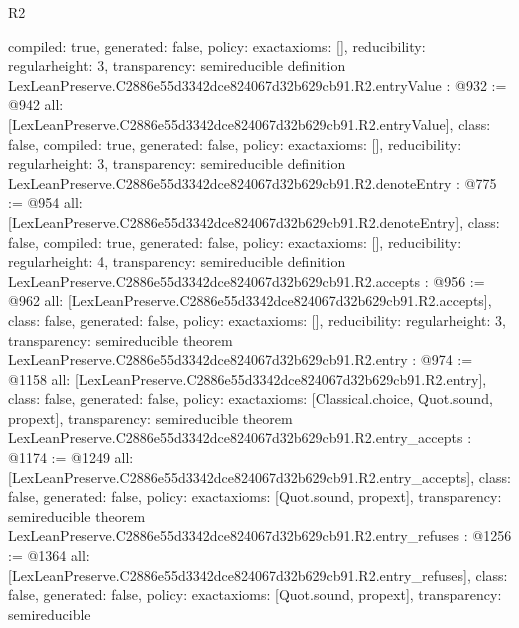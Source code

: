 \begin{lexlean}{R2}
\begin{coremodule}
{  compiled: true,
  generated: false,
  policy: exact{axioms: []},
  reducibility: regular{height: 3},
  transparency: semireducible
}
definition LexLeanPreserve.C2886e55d3342dce824067d32b629cb91.R2.entryValue : @932 := @942 {
  all: [LexLeanPreserve.C2886e55d3342dce824067d32b629cb91.R2.entryValue],
  class: false,
  compiled: true,
  generated: false,
  policy: exact{axioms: []},
  reducibility: regular{height: 3},
  transparency: semireducible
}
definition LexLeanPreserve.C2886e55d3342dce824067d32b629cb91.R2.denoteEntry : @775 := @954 {
  all: [LexLeanPreserve.C2886e55d3342dce824067d32b629cb91.R2.denoteEntry],
  class: false,
  compiled: true,
  generated: false,
  policy: exact{axioms: []},
  reducibility: regular{height: 4},
  transparency: semireducible
}
definition LexLeanPreserve.C2886e55d3342dce824067d32b629cb91.R2.accepts : @956 := @962 {
  all: [LexLeanPreserve.C2886e55d3342dce824067d32b629cb91.R2.accepts],
  class: false,
  generated: false,
  policy: exact{axioms: []},
  reducibility: regular{height: 3},
  transparency: semireducible
}
theorem LexLeanPreserve.C2886e55d3342dce824067d32b629cb91.R2.entry : @974 := @1158 {
  all: [LexLeanPreserve.C2886e55d3342dce824067d32b629cb91.R2.entry],
  class: false,
  generated: false,
  policy: exact{axioms: [Classical.choice, Quot.sound, propext]},
  transparency: semireducible
}
theorem LexLeanPreserve.C2886e55d3342dce824067d32b629cb91.R2.entry_accepts : @1174 := @1249 {
  all: [LexLeanPreserve.C2886e55d3342dce824067d32b629cb91.R2.entry_accepts],
  class: false,
  generated: false,
  policy: exact{axioms: [Quot.sound, propext]},
  transparency: semireducible
}
theorem LexLeanPreserve.C2886e55d3342dce824067d32b629cb91.R2.entry_refuses : @1256 := @1364 {
  all: [LexLeanPreserve.C2886e55d3342dce824067d32b629cb91.R2.entry_refuses],
  class: false,
  generated: false,
  policy: exact{axioms: [Quot.sound, propext]},
  transparency: semireducible
}


\end{coremodule}
\end{lexlean}
